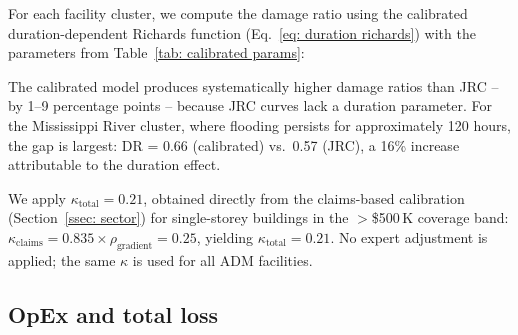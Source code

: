 For each facility cluster, we compute the damage ratio using the calibrated duration-dependent Richards function (Eq.~\ref{eq: duration richards}) with the parameters from Table~\ref{tab: calibrated params}:

\begin{table}[h!]
\centering
\small
{}
\caption{Calibrated damage ratios for ADM flood-exposed facilities. DR (calibrated) uses the duration-dependent Richards function; DR (JRC) uses standard JRC curves. $\kappa_{\text{total}} = 0.21$ from the claims-based calibration for single-storey industrial buildings (Table~\ref{tab: kappa claims}, Eq.~\ref{eq: kappa total}).}
\label{tab: adm calibrated}
\end{table}

The calibrated model produces systematically higher damage ratios than JRC -- by 1--9 percentage points -- because JRC curves lack a duration parameter. For the Mississippi River cluster, where flooding persists for approximately 120 hours, the gap is largest: DR = 0.66 (calibrated) vs.\ 0.57 (JRC), a 16\% increase attributable to the duration effect.

We apply $\kappa_{\text{total}} = 0.21$, obtained directly from the claims-based calibration (Section~\ref{ssec: sector}) for single-storey buildings in the $>$\$500\,K coverage band: $\kappa_{\text{claims}} = 0.835 \times \rho_{\text{gradient}} = 0.25$, yielding $\kappa_{\text{total}} = 0.21$. No expert adjustment is applied; the same $\kappa$ is used for all ADM facilities.

\subsection{OpEx and total loss}

